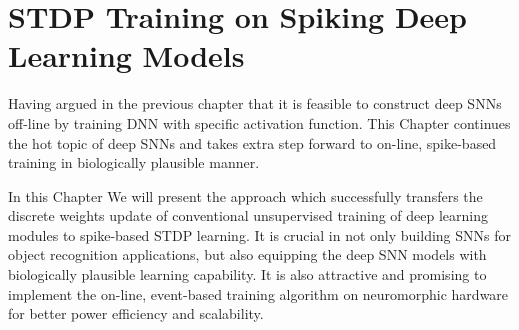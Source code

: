 \chapter{STDP Training on Spiking Deep Learning Models}
\label{cha:sdlm}
Having argued in the previous chapter that it is feasible to construct deep SNNs off-line by training DNN with specific activation function.
This Chapter continues the hot topic of deep SNNs and takes extra step forward to on-line, spike-based training in biologically plausible manner.

In this Chapter We will present the approach which successfully transfers the discrete weights update of conventional unsupervised training of deep learning modules to spike-based STDP learning.
It is crucial in not only building SNNs for object recognition applications, but also equipping the deep SNN models with biologically plausible learning capability.
It is also attractive and promising to implement the on-line, event-based training algorithm on neuromorphic hardware for better power efficiency and scalability.


